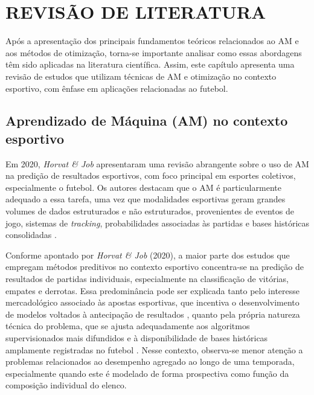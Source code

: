 \chapter{REVISÃO DE LITERATURA}

Após a apresentação dos principais fundamentos teóricos relacionados ao AM e aos métodos de otimização, torna-se importante analisar como essas 
abordagens têm sido aplicadas na literatura científica. Assim, este capítulo apresenta uma revisão de estudos que utilizam técnicas de AM e otimização 
no contexto esportivo, com ênfase em aplicações relacionadas ao futebol.

\section{Aprendizado de Máquina (AM) no contexto esportivo}

Em 2020, \textit{Horvat \& Job} apresentaram uma revisão abrangente sobre o uso de AM na predição de resultados esportivos, 
com foco principal em esportes coletivos, especialmente o futebol. Os autores destacam que o AM é particularmente adequado a essa tarefa, 
uma vez que modalidades esportivas geram grandes volumes de dados estruturados e não estruturados, provenientes de eventos de jogo, sistemas de \textit{tracking}, 
probabilidades associadas às partidas e bases históricas consolidadas \cite{Horvat2020}.

Conforme apontado por \textit{Horvat \& Job} (2020), a maior parte dos estudos que empregam métodos preditivos no contexto esportivo concentra-se na predição 
de resultados de partidas individuais, especialmente na classificação de vitórias, empates e derrotas. Essa predominância pode ser explicada tanto pelo 
interesse mercadológico associado às apostas esportivas, que incentiva o desenvolvimento de modelos voltados à antecipação de resultados \cite{Abidin2021}, 
quanto pela própria natureza técnica do problema, que se ajusta adequadamente aos algoritmos supervisionados mais difundidos e à disponibilidade de bases 
históricas amplamente registradas no futebol \cite{Horvat2020}. Nesse contexto, observa-se menor atenção a problemas relacionados ao desempenho agregado ao 
longo de uma temporada, especialmente quando este é modelado de forma prospectiva como função da composição individual do elenco.


